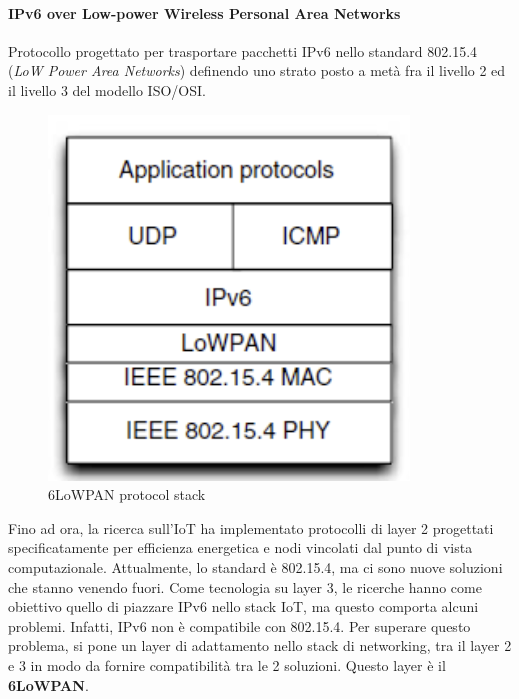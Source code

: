 \documentclass{article}
\begin{document}
\paragraph{IPv6 over Low-power Wireless Personal Area Networks}
Protocollo progettato per trasportare pacchetti IPv6 nello standard 802.15.4 (\textit{LoW Power Area Networks}) definendo uno strato posto a metà fra il livello 2 ed il livello 3 del modello ISO/OSI.
\begin{figure}[H]
\centering
\includegraphics[scale=0.6]{figures/6LoWPAN stack.png}
\caption{6LoWPAN protocol stack}
\end{figure}
Fino ad ora, la ricerca sull'IoT ha implementato protocolli di layer 2 progettati specificatamente per efficienza energetica e nodi vincolati dal punto di vista computazionale. Attualmente, lo standard è 802.15.4, ma ci sono nuove soluzioni che stanno venendo fuori. Come tecnologia su layer 3, le ricerche hanno come obiettivo quello di piazzare IPv6 nello stack IoT, ma questo comporta alcuni problemi. Infatti, IPv6 non è compatibile con 802.15.4. Per superare questo problema, si pone un layer di adattamento nello stack di networking, tra il layer 2 e 3 in modo da fornire compatibilità tra le 2 soluzioni. Questo layer è il \textbf{6LoWPAN}.
\end{document}
